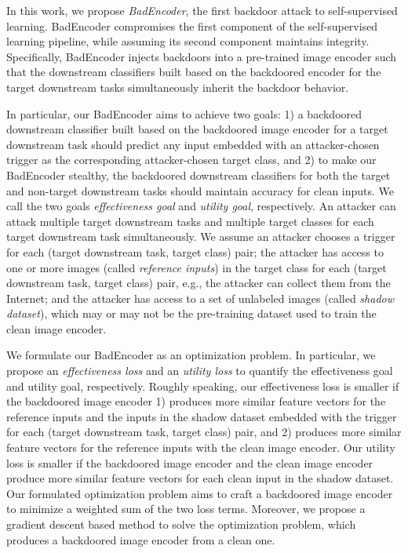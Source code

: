  In this work, we propose \emph{BadEncoder}, the first backdoor attack to self-supervised learning.   BadEncoder compromises the first component of the self-supervised learning pipeline, while assuming its  second component maintains integrity. Specifically,  BadEncoder  injects backdoors into a pre-trained image encoder such that the downstream classifiers built based on the backdoored encoder for the target downstream tasks simultaneously inherit the backdoor behavior. 

In particular, 
 our BadEncoder aims to achieve two goals: 1) a  backdoored downstream classifier  built based on the backdoored image encoder for a target downstream task should predict any input embedded with an attacker-chosen  trigger as the corresponding attacker-chosen target class, and 2) to make our BadEncoder stealthy, the backdoored downstream classifiers for both the target and non-target downstream tasks should maintain  accuracy for clean inputs. We call the two goals \emph{effectiveness goal} and \emph{utility goal}, respectively. An attacker can attack multiple target downstream tasks and multiple target classes for each target downstream task simultaneously. 
 We assume an attacker chooses a trigger for each (target downstream task, target class) pair; the attacker has access to one or more images (called \emph{reference inputs}) in the target class for each (target downstream task, target class) pair, e.g., the attacker can collect them from the Internet; and the attacker has access to a set of unlabeled images (called \emph{shadow dataset}), which may or may not be the pre-training dataset used to train the clean image encoder. 
 
We formulate our BadEncoder as an optimization problem. In particular, we propose an \emph{effectiveness loss} and an \emph{utility loss} to quantify the {effectiveness goal} and {utility goal}, respectively. Roughly speaking,  our effectiveness loss is smaller if the backdoored image encoder 1) produces more similar feature vectors for the reference inputs and the inputs in the shadow dataset embedded with the trigger for each (target downstream task, target class) pair, and 2) produces more similar feature vectors for the reference inputs with the clean image encoder. Our utility loss is smaller if the backdoored image encoder and the clean image encoder produce more similar feature vectors for each clean input in the shadow dataset. Our formulated optimization problem aims to craft a backdoored image encoder to minimize a weighted sum of the two loss terms. Moreover, we propose a gradient descent based method to solve the optimization problem, which produces a backdoored image encoder from a clean one. 
 

